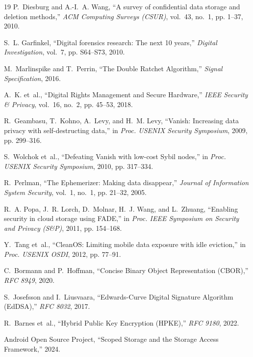 \documentclass[conference]{IEEEtran}
\begin{document}
\begin{thebibliography}{19}
P.~Diesburg and A.-I.~A. Wang, ``A survey of confidential data storage and deletion methods,'' \emph{ACM Computing Surveys (CSUR)}, vol.~43, no.~1, pp. 1--37, 2010.

S.~L. Garfinkel, ``Digital forensics research: The next 10 years,'' \emph{Digital Investigation}, vol.~7, pp. S64--S73, 2010.

M.~Marlinspike and T.~Perrin, ``The Double Ratchet Algorithm,'' \emph{Signal Specification}, 2016.

A.~K. et~al., ``Digital Rights Management and Secure Hardware,'' \emph{IEEE Security \& Privacy}, vol.~16, no.~2, pp. 45--53, 2018.

R.~Geambasu, T.~Kohno, A.~Levy, and H.~M. Levy, ``Vanish: Increasing data privacy with self-destructing data,'' in \emph{Proc. USENIX Security Symposium}, 2009, pp. 299--316.

S.~Wolchok et~al., ``Defeating Vanish with low-cost Sybil nodes,'' in \emph{Proc. USENIX Security Symposium}, 2010, pp. 317--334.

R.~Perlman, ``The Ephemerizer: Making data disappear,'' \emph{Journal of Information System Security}, vol.~1, no.~1, pp. 21--32, 2005.

R.~A. Popa, J.~R. Lorch, D.~Molnar, H.~J. Wang, and L.~Zhuang, ``Enabling security in cloud storage using FADE,'' in \emph{Proc. IEEE Symposium on Security and Privacy (S\&P)}, 2011, pp. 154--168.

Y.~Tang et~al., ``CleanOS: Limiting mobile data exposure with idle eviction,'' in \emph{Proc. USENIX OSDI}, 2012, pp. 77--91.

C.~Bormann and P.~Hoffman, ``Concise Binary Object Representation (CBOR),'' \emph{RFC 8949}, 2020.

S.~Josefsson and I.~Liusvaara, ``Edwards-Curve Digital Signature Algorithm (EdDSA),'' \emph{RFC 8032}, 2017.

R.~Barnes et~al., ``Hybrid Public Key Encryption (HPKE),'' \emph{RFC 9180}, 2022.

Android Open Source Project, ``Scoped Storage and the Storage Access Framework,'' 2024.


\end{thebibliography}
\end{document}
